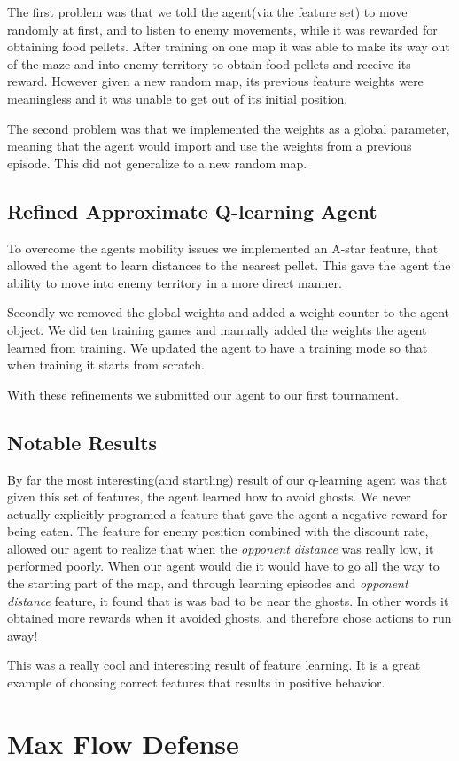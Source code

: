 \documentclass[11pt]{article}
\begin{document}
The first problem was that we told the agent(via the feature set) to move randomly at first, and to listen to
enemy movements, while it was rewarded for obtaining food pellets.
After training on one map it was able to make its way out of the maze and into
enemy territory to obtain food pellets and receive its reward. However given a new random map,
its previous feature weights were meaningless and it was unable to get out of its initial position. \

The second problem was that we implemented the weights as a global parameter, meaning that
the agent would import and use the weights from a previous episode. This did not generalize to
a new random map.\

\subsection{Refined Approximate Q-learning Agent}
To overcome the agents mobility issues we implemented an A-star feature, that allowed
the agent to learn distances to the nearest pellet. This gave the agent the ability to
move into enemy territory in a more direct manner. \

Secondly we removed the global weights and added a weight counter to the agent object.
We did ten training games and manually added the weights the agent learned from
training. We updated the agent to have a training mode so that when training
it starts from scratch.\

With these refinements we submitted our agent to our first tournament.\

\subsection{Notable Results}
By far the most interesting(and startling) result of our q-learning agent was that
given this set of features, the agent learned how to avoid ghosts. We never actually
explicitly programed a feature that gave the agent a negative reward for being eaten.
The feature for enemy position combined with the discount rate, allowed our agent to
realize that when the \textit{opponent distance} was really low, it performed poorly.
When our agent would die it would have to go all the way to the starting part of the map, and through
learning episodes and \textit{opponent distance} feature, it found that is was bad to be
near the ghosts. In other words it obtained more rewards when it avoided
ghosts, and therefore chose actions to run away! \

This was a really cool and interesting result of feature learning. It is a great example of
choosing correct features that results in positive behavior.

\section{Max Flow Defense}
\end{document}

